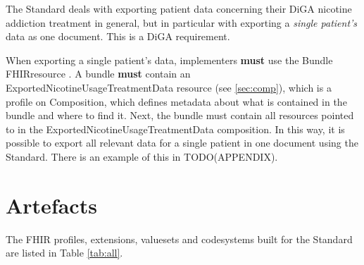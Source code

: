 \documentclass[12px]{report}
\newcommand{\fhir}{FHIR\textsuperscript{\textregistered}}
\begin{document}
The Standard deals with exporting patient data concerning their DiGA nicotine addiction treatment in general,
but in particular with exporting a \textit{single patient's} data as one document. This is a DiGA requirement.

When exporting a single patient's data, implementers \textbf{must} use the Bundle \fhir resource \cite{bundle}. A bundle \textbf{must} contain an ExportedNicotineUsageTreatmentData resource (see \ref{sec:comp}), which is a profile on Composition,
which defines metadata about what is contained in the bundle and where to find it. Next, the bundle must contain all resources pointed to in the ExportedNicotineUsageTreatmentData composition. In this way, it is possible
to export all relevant data for a single patient in one document using the Standard. There is an example of this in TODO(APPENDIX).

\section{Artefacts}
The FHIR profiles, extensions, valuesets and codesystems built for the Standard are listed in Table \ref{tab:all}.
\end{document}
